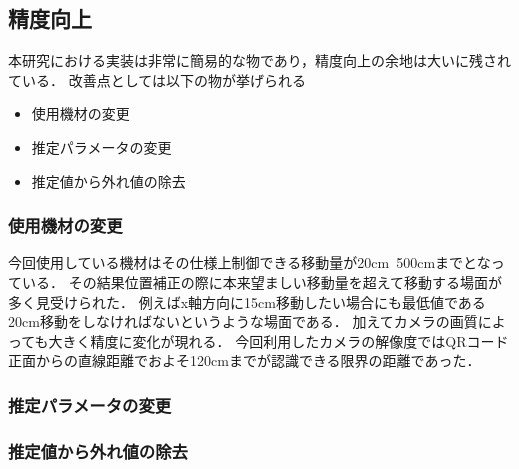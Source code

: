 \subsection{精度向上}
本研究における実装は非常に簡易的な物であり，精度向上の余地は大いに残されている．
改善点としては以下の物が挙げられる
\begin{itemize}
    \item 使用機材の変更
    \item 推定パラメータの変更
    \item 推定値から外れ値の除去
\end{itemize}

\subsubsection{使用機材の変更}
今回使用している機材はその仕様上制御できる移動量が20cm~500cmまでとなっている．
その結果位置補正の際に本来望ましい移動量を超えて移動する場面が多く見受けられた．
例えばx軸方向に15cm移動したい場合にも最低値である20cm移動をしなければないというような場面である．
加えてカメラの画質によっても大きく精度に変化が現れる．
今回利用したカメラの解像度ではQRコード正面からの直線距離でおよそ120cmまでが認識できる限界の距離であった．


\subsubsection{推定パラメータの変更}

\subsubsection{推定値から外れ値の除去}



